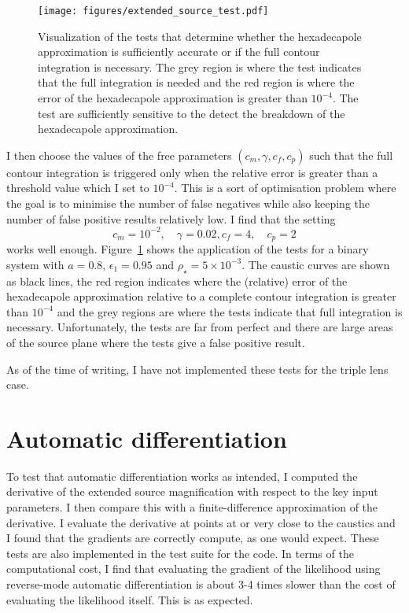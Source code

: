 \documentclass[12pt,dvipsnames]{report}
\begin{document}
\begin{figure}[t]
    \begin{centering}
        \texttt{[image: figures/extended\_source\_test.pdf]}
        \caption{
            Visualization of the tests that determine whether the 
            hexadecapole approximation is sufficiently accurate or if the full contour 
            integration is necessary. The grey region is where the test indicates 
            that the full integration is needed and the red region is where the 
            error of the hexadecapole approximation is greater than $10^{-4}$.
            The test are sufficiently sensitive to the detect the breakdown of the 
            hexadecapole approximation.
            }
            \label{fig:extended_source_test}
    \end{centering}
\end{figure}

I then choose the values of the free parameters $(c_m, \gamma, c_f, c_p)$ such that the 
full contour integration is triggered only when the relative error is greater than a threshold 
value which I set to $10^{-4}$. This is a sort of optimisation problem where the goal is to minimise
the number of false negatives while also keeping the number of false positive results 
relatively low. I find that the setting 
\begin{equation}
    c_m=10^{-2},\quad \gamma=0.02, c_f=4, \quad c_p=2
\end{equation}
works well enough. Figure~\ref{fig:extended_source_test} shows the application of the tests for a binary 
system with $a=0.8$, $\epsilon_1=0.95$ and $\rho_\star=5\times 10^{-3}$. The caustic 
curves are shown as black lines, the red region indicates where the (relative) error of 
the hexadecapole approximation relative to a complete contour integration is greater than 
$10^{-4}$ and the grey regions are where the tests indicate that full integration is 
necessary. Unfortunately, the tests are far from perfect and there are large areas of the 
source plane where the tests give a false positive result. 

As of the time of writing, I have not implemented these tests for the triple lens case.

\section{Automatic differentiation}
\label{sec:caustics_autodiff}
To test that automatic differentiation works as intended, I computed the derivative 
of the extended source magnification with respect to the key input parameters. 
I then compare this with a finite-difference approximation of the derivative.
I evaluate the derivative at points at or very close to the caustics and I found 
that the gradients are correctly compute, as one would expect. These tests 
are also implemented in the test suite for the code. 
In terms of the computational cost, I find that evaluating the gradient of the likelihood
using reverse-mode automatic differentiation is about 3-4 times slower than the 
cost of evaluating the likelihood itself. This is as expected.
\end{document}
